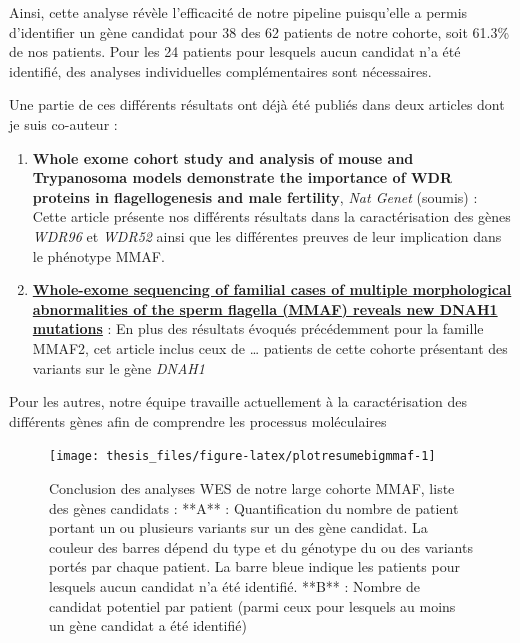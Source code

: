\documentclass[12pt,twoside]{reedthesis}
\theoremstyle{definition}
\theoremstyle{definition}
\theoremstyle{remark}
\begin{document}
  Ainsi, cette analyse révèle l'efficacité de notre pipeline puisqu'elle a
  permis d'identifier un gène candidat pour 38 des 62 patients de notre
  cohorte, soit 61.3\% de nos patients. Pour les 24 patients pour lesquels
  aucun candidat n'a été identifié, des analyses individuelles
  complémentaires sont nécessaires.
  
  Une partie de ces différents résultats ont déjà été publiés dans deux
  articles dont je suis co-auteur :
  
  \begin{enumerate}
  \def\labelenumi{\arabic{enumi}.}
  \item
    \textbf{Whole exome cohort study and analysis of mouse and Trypanosoma
    models demonstrate the importance of WDR proteins in flagellogenesis
    and male fertility}, \emph{Nat Genet} (soumis) : Cette article
    présente nos différents résultats dans la caractérisation des gènes
    \emph{WDR96} et \emph{WDR52} ainsi que les différentes preuves de leur
    implication dans le phénotype MMAF.
  \item
    \protect\hyperlink{famdnah1}{\textbf{Whole-exome sequencing of
    familial cases of multiple morphological abnormalities of the sperm
    flagella (MMAF) reveals new DNAH1 mutations}} : En plus des résultats
    évoqués précédemment pour la famille MMAF2, cet article inclus ceux de
    \ldots{} patients de cette cohorte présentant des variants sur le gène
    \emph{DNAH1}
  \end{enumerate}
  
  Pour les autres, notre équipe travaille actuellement à la
  caractérisation des différents gènes afin de comprendre les processus
  moléculaires
  
  \newpage
  
  \begin{figure}
  
  {\centering \texttt{[image: thesis\_files/figure-latex/plotresumebigmmaf-1]} 
  
  }
  
  \caption[Conclusion des analyses WES de notre large cohorte MMAF, liste des gènes candidats]{Conclusion des analyses WES de notre large cohorte MMAF, liste des gènes candidats : **A** : Quantification du nombre de patient portant un ou plusieurs variants sur un des gène candidat. La couleur des barres dépend du type et du génotype du ou des variants portés par chaque patient. La barre bleue indique les patients pour lesquels aucun candidat n'a été identifié. **B** : Nombre de candidat potentiel par patient (parmi ceux pour lesquels au moins un gène candidat a été identifié)}\label{fig:plotresumebigmmaf}
  \end{figure}
  
\end{document}
